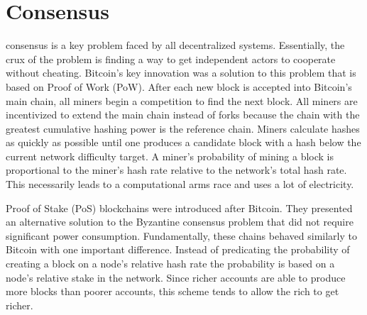 \section{Consensus}
\label{sec:consensus}




 consensus is a key problem faced by all decentralized systems.
Essentially, the crux of the problem is finding a way to get independent actors to cooperate without cheating.
Bitcoin's key innovation was a solution to this problem that is based on Proof of Work (PoW).
After each new block is accepted into Bitcoin's main chain, all miners begin a competition to find the next block.
All miners are incentivized to extend the main chain instead of forks because the chain with the greatest cumulative hashing power is the reference chain.
Miners calculate hashes as quickly as possible until one produces a candidate block with a hash below the current network difficulty target.
A miner's probability of mining a block is proportional to the miner's hash rate relative to the network's total hash rate.
This necessarily leads to a computational arms race and uses a lot of electricity.

Proof of Stake (PoS)\cite{King:2012:PPP}\cite{Nxt2013} blockchains were introduced after Bitcoin.
They presented an alternative solution to the Byzantine consensus problem that did not require significant power consumption.
Fundamentally, these chains behaved similarly to Bitcoin with one important difference.
Instead of predicating the probability of creating a block on a node's relative hash rate the probability is based on a node's relative stake in the network.
Since richer accounts are able to produce more blocks than poorer accounts, this scheme tends to allow the rich to get richer.


